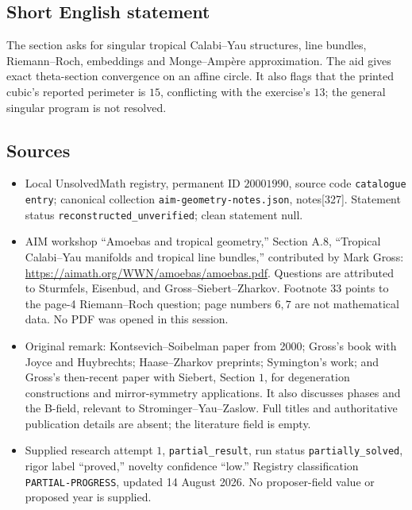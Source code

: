 \documentclass[11pt]{article}
\begin{document}
\subsection{Short English statement}
The section asks for singular tropical Calabi--Yau structures, line bundles, Riemann--Roch, embeddings and Monge--Amp\`ere approximation. The aid gives exact theta-section convergence on an affine circle. It also flags that the printed cubic's reported perimeter is \(15\), conflicting with the exercise's \(13\); the general singular program is not resolved.
\subsection{Sources}
\begin{itemize}
\item Local UnsolvedMath registry, permanent ID \(20001990\), source code \texttt{catalogue entry}; canonical collection \texttt{aim-geometry-notes.json}, notes[327]. Statement status \texttt{reconstructed\_unverified}; clean statement null.
\item AIM workshop ``Amoebas and tropical geometry,'' Section A.8, ``Tropical Calabi--Yau manifolds and tropical line bundles,'' contributed by Mark Gross: \url{https://aimath.org/WWN/amoebas/amoebas.pdf}. Questions are attributed to Sturmfels, Eisenbud, and Gross--Siebert--Zharkov. Footnote \(33\) points to the page-4 Riemann--Roch question; page numbers \(6,7\) are not mathematical data. No PDF was opened in this session.
\item Original remark: Kontsevich--Soibelman paper from 2000; Gross's book with Joyce and Huybrechts; Haase--Zharkov preprints; Symington's work; and Gross's then-recent paper with Siebert, Section \(1\), for degeneration constructions and mirror-symmetry applications. It also discusses phases and the B-field, relevant to Strominger--Yau--Zaslow. Full titles and authoritative publication details are absent; the literature field is empty.
\item Supplied research attempt \(1\), \texttt{partial\_result}, run status \texttt{partially\_solved}, rigor label ``proved,'' novelty confidence ``low.'' Registry classification \texttt{PARTIAL-PROGRESS}, updated 14 August 2026. No proposer-field value or proposed year is supplied.
\end{itemize}
\end{document}
